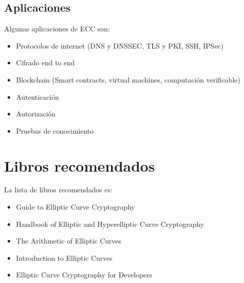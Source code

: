   \subsection{Aplicaciones}
  Algunas aplicaciones de ECC son:
  \begin{itemize}
    \item Protocolos de internet (DNS y DNSSEC, TLS y PKI, SSH, IPSec)
    \item Cifrado end to end
    \item Blockchain (Smart contracts, virtual machines, computación verificable)
    \item Autenticación 
    \item Autorización 
    \item Pruebas de conocimiento
  \end{itemize}

  \section{Libros recomendados}
  La lista de libros recomendados es:
  \begin{itemize}
    \item Guide to Elliptic Curve Cryptography
    \item Handbook of Elliptic and Hyperelliptic Curve Cryptography 
    \item The Arithmetic of Elliptic Curves 
    \item Introduction to Elliptic Curves 
    \item Elliptic Curve Cryptography for Developers
  \end{itemize}


